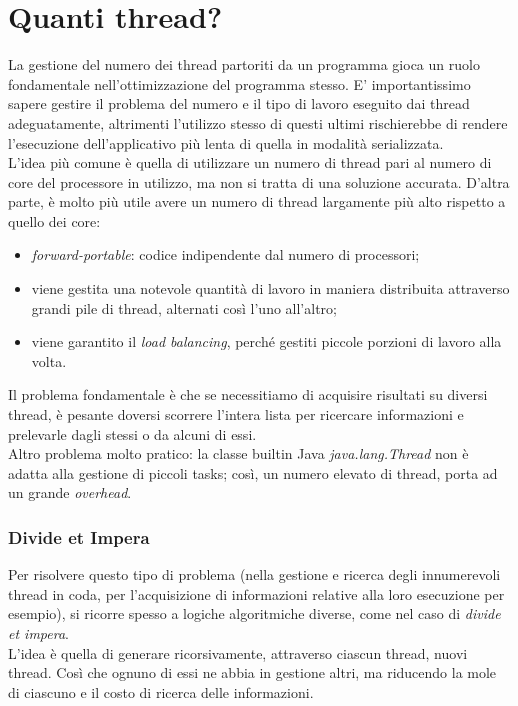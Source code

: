 \section{Quanti thread?}
La gestione del numero dei thread partoriti da un programma gioca un ruolo fondamentale nell'ottimizzazione del programma stesso. E' importantissimo sapere gestire il problema del numero e il tipo di lavoro eseguito dai thread adeguatamente, altrimenti l'utilizzo stesso di questi ultimi rischierebbe di rendere l'esecuzione dell'applicativo più lenta di quella in modalità serializzata. \\
L'idea più comune è quella di utilizzare un numero di thread pari al numero di core del processore in utilizzo, ma non si tratta di una soluzione accurata. D'altra parte, è molto più utile avere un numero di thread largamente più alto rispetto a quello dei core:
\begin{itemize}
	\item \textit{forward-portable}: codice indipendente dal numero di processori;
	\item viene gestita una notevole quantità di lavoro in maniera distribuita attraverso grandi pile di thread, alternati così l'uno all'altro;
	\item viene garantito il \textit{load balancing}, perché gestiti piccole porzioni di lavoro alla volta.
\end{itemize}
Il problema fondamentale è che se necessitiamo di acquisire risultati su diversi thread, è pesante doversi scorrere l'intera lista per ricercare informazioni e prelevarle dagli stessi o da alcuni di essi. \\
Altro problema molto pratico: la classe builtin Java \textit{java.lang.Thread} non è adatta alla gestione di piccoli tasks; così, un numero elevato di thread, porta ad un grande \textit{overhead}.

\subsubsection{Divide et Impera}
Per risolvere questo tipo di problema (nella gestione e ricerca degli innumerevoli thread in coda, per l'acquisizione di informazioni relative alla loro esecuzione per esempio), si ricorre spesso a logiche algoritmiche diverse, come nel caso di \textit{divide et impera}. \\
L'idea è quella di generare ricorsivamente, attraverso ciascun thread, nuovi thread. Così che ognuno di essi ne abbia in gestione altri, ma riducendo la mole di ciascuno e il costo di ricerca delle informazioni.

